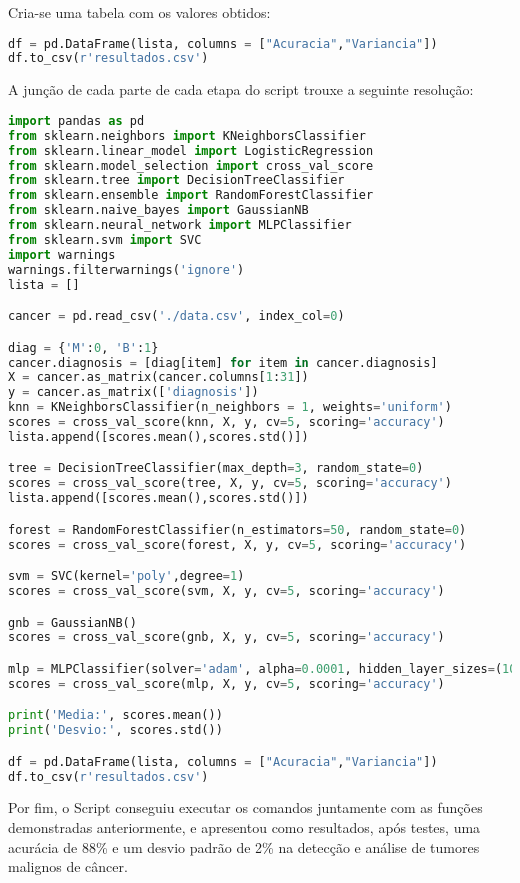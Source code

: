 Cria-se uma tabela com os valores obtidos:
\begin{lstlisting}[language=Python, caption=Resultados]
df = pd.DataFrame(lista, columns = ["Acuracia","Variancia"])
df.to_csv(r'resultados.csv')
\end{lstlisting}

A junção de cada parte de cada etapa do script trouxe a seguinte resolução:
\begin{lstlisting}[language=Python, caption=Código completo]
import pandas as pd
from sklearn.neighbors import KNeighborsClassifier
from sklearn.linear_model import LogisticRegression
from sklearn.model_selection import cross_val_score
from sklearn.tree import DecisionTreeClassifier
from sklearn.ensemble import RandomForestClassifier
from sklearn.naive_bayes import GaussianNB
from sklearn.neural_network import MLPClassifier
from sklearn.svm import SVC
import warnings
warnings.filterwarnings('ignore')
lista = []

cancer = pd.read_csv('./data.csv', index_col=0)

diag = {'M':0, 'B':1}
cancer.diagnosis = [diag[item] for item in cancer.diagnosis]
X = cancer.as_matrix(cancer.columns[1:31])
y = cancer.as_matrix(['diagnosis'])
knn = KNeighborsClassifier(n_neighbors = 1, weights='uniform')
scores = cross_val_score(knn, X, y, cv=5, scoring='accuracy')
lista.append([scores.mean(),scores.std()])

tree = DecisionTreeClassifier(max_depth=3, random_state=0)
scores = cross_val_score(tree, X, y, cv=5, scoring='accuracy')
lista.append([scores.mean(),scores.std()])

forest = RandomForestClassifier(n_estimators=50, random_state=0)
scores = cross_val_score(forest, X, y, cv=5, scoring='accuracy')

svm = SVC(kernel='poly',degree=1)
scores = cross_val_score(svm, X, y, cv=5, scoring='accuracy')

gnb = GaussianNB()
scores = cross_val_score(gnb, X, y, cv=5, scoring='accuracy')

mlp = MLPClassifier(solver='adam', alpha=0.0001, hidden_layer_sizes=(10,20,40), random_state=42, learning_rate='constant', learning_rate_init=0.01, max_iter=100, activation='logistic', momentum=0.9, tol=0.0001)
scores = cross_val_score(mlp, X, y, cv=5, scoring='accuracy')

print('Media:', scores.mean())
print('Desvio:', scores.std())

df = pd.DataFrame(lista, columns = ["Acuracia","Variancia"])
df.to_csv(r'resultados.csv')
\end{lstlisting}

Por fim, o Script conseguiu executar os comandos juntamente com as funções demonstradas anteriormente, e apresentou como resultados, após testes, uma acurácia de 88\% e um desvio padrão de 2\% na detecção e análise de tumores malignos de câncer.



